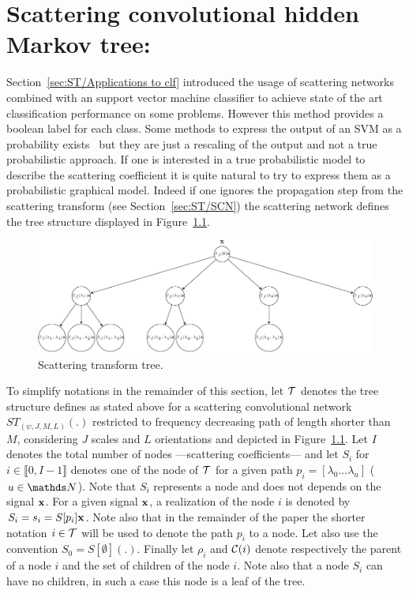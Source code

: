 \documentclass[a4paper,11pt]{report}
\begin{document}
\chapter{Scattering convolutional hidden Markov tree:}
  \label{chap:SCHMT}
  Section~\ref{sec:ST/Applications to clf} introduced the usage of scattering networks combined with an support vector machine classifier to achieve state of the art classification performance on some problems. However this method provides a boolean label for each class. Some methods to express the output of an SVM as a probability exists~\citep{platt1999probabilistic} but they are just a rescaling of the output and not a true probabilistic approach. If one is interested in a true probabilistic model to describe the scattering coefficient it is quite natural to try to express them as a probabilistic graphical model. Indeed if one ignores the propagation step from the scattering transform (see Section~\ref{sec:ST/SCN}) the scattering network defines the tree structure displayed in Figure~\ref{fig:ST tree}. \\

	\begin{figure}[h]
			\begin{center}
				\includegraphics[width=5in]{scat_tree_crop.pdf}
				\caption{Scattering transform tree.}
				\label{fig:ST tree}
			\end{center}
	\end{figure}
  
  To simplify notations in the remainder of this section, let $\mathcal{T}$ denotes the tree structure defines as stated above for a scattering convolutional network $ST_{(\psi, J, M, L)}(.)$ restricted to frequency decreasing path of length shorter than $M$, considering $J$ scales and $L$ orientations and depicted in Figure~\ref{fig:ST tree}.  Let $I$ denotes the total number of nodes ---\ie scattering coefficients--- and let $S_{i}$ for $i \in \llbracket0, I-1 \rrbracket$ denotes one of the node of $\mathcal{T}$ for a given path $p_{i} = [\lambda_{0} ... \lambda_{u}]$ ($u\in \dsN$). Note that $S_{i}$ represents a node and does not depends on the signal ${\bf x}$. For a given signal ${\bf x}$, a realization of the node $i$ is denoted by $S_{i}= s_{i} = S[p_{i}]{\bf x}$. Note also that in the remainder of the paper the shorter notation $i \in \mathcal{T}$ will be used to denote the path $p_{i}$ to a node. Let also use the convention $S_{0} = S[\emptyset](.)$. Finally let $\rho_{i}$ and $\mathcal{C}(i)$ denote respectively the parent of a node $i$ and the set of children of the node $i$. Note also that a node $S_{i}$ can have no children, in such a case this node is a leaf of the tree.\\
  
\end{document}
